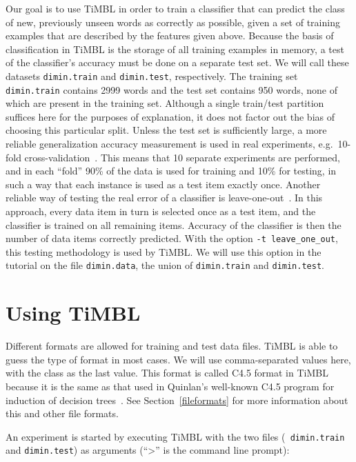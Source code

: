 \documentclass{report}
\begin{document}
Our goal is to use TiMBL in order to train a classifier that can
predict the class of new, previously unseen words as correctly as
possible, given a set of training examples that are described by the
features given above. Because the basis of classification in TiMBL is
the storage of all training examples in memory, a test of the
classifier's accuracy must be done on a separate test set. We will
call these datasets {\tt dimin.train} and {\tt dimin.test},
respectively. The training set {\tt dimin.train} contains 2999 words
and the test set contains 950 words, none of which are present in the
training set. Although a single train/test partition suffices here for
the purposes of explanation, it does not factor out the bias of
choosing this particular split. Unless the test set is sufficiently
large, a more reliable generalization accuracy measurement is used in
real experiments, e.g.~10-fold cross-validation~\cite{Weiss+91}. This
means that 10 separate experiments are performed, and in each ``fold''
90\% of the data is used for training and 10\% for testing, in such a
way that each instance is used as a test item exactly once. Another
reliable way of testing the real error of a classifier is
leave-one-out~\cite{Weiss+91}. In this approach, every data item in
turn is selected once as a test item, and the classifier is trained on
all remaining items. Accuracy of the classifier is then the number of
data items correctly predicted. With the option {\tt -t
leave\_one\_out}, this testing methodology is used by TiMBL. We
will use this option in the tutorial on the file {\tt dimin.data}, the
union of {\tt dimin.train} and {\tt dimin.test}. 

\section{Using TiMBL}

Different formats are allowed for training and test data files. TiMBL
is able to guess the type of format in most cases. We will use
comma-separated values here, with the class as the last value. This
format is called C4.5 format in TiMBL because it is the same as that
used in Quinlan's well-known C4.5 program for induction of decision
trees~\cite{Quinlan93}. See Section~\ref{fileformats} for more
information about this and other file formats.

An experiment is started by executing TiMBL with the two files ({\tt
  dimin.train} and {\tt dimin.test}) as arguments (``>'' is the
command line prompt):
\end{document}
